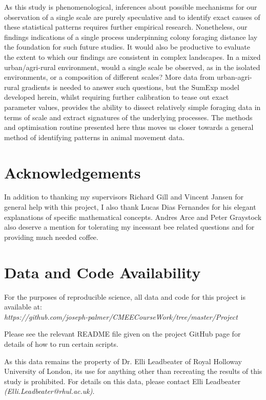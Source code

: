 \documentclass[11pt,usenames,dvipsnames,a4paper]{article}
\begin{document}
\begin{linenumbers}
As this study is phenomenological, inferences about possible mechanisms for our observation of a single scale are purely speculative and to identify exact causes of these statistical patterns requires further empirical research. Nonetheless, our findings indications of a single process underpinning colony foraging distance lay the foundation for such future studies. It would also be productive to evaluate the extent to which our findings are consistent in complex landscapes. In a mixed urban/agri-rural environment, would a single scale be observed, as in the isolated environments, or a composition of different scales? More data from urban-agri-rural gradients is needed to answer such questions, but the SumExp model developed herein, whilst requiring further calibration to tease out exact parameter values, provides the ability to dissect relatively simple foraging data in terms of scale and extract signatures of the underlying processes. The methods and optimisation routine presented here thus moves us closer towards a general method of identifying patterns in animal movement data.
\end{linenumbers}

\section{Acknowledgements}

In addition to thanking my supervisors Richard Gill and Vincent Jansen for general help with this project, I also thank Lucas Dias Fernandes for his elegant explanations of specific mathematical concepts. Andres Arce and Peter Graystock also deserve a mention for tolerating my incessant bee related questions and for providing much needed coffee.

\newpage
\section{Data and Code Availability}
For the purposes of reproducible science, all data and code for this project is available at:\\ \textit{https://github.com/joseph-palmer/CMEECourseWork/tree/master/Project}

\noindent
Please see the relevant README file given on the project GitHub page for details of how to run certain scripts.

\noindent
As this data remains the property of Dr. Elli Leadbeater of Royal Holloway University of London, its use for anything other than recreating the results of this study is prohibited. For details on this data, please contact Elli Leadbeater \textit{(Elli.Leadbeater@rhul.ac.uk)}.

\newpage



\end{document}
